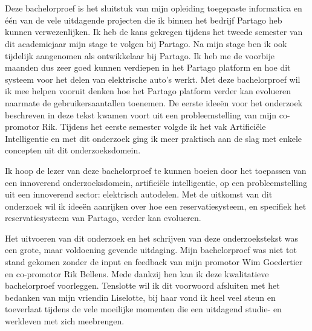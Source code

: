 
\chapter*{}
\label{ch:voorwoord}

Deze bachelorproef is het sluitstuk van mijn opleiding toegepaste informatica en één van de vele uitdagende projecten die ik binnen het bedrijf Partago heb kunnen verwezenlijken. Ik heb de kans gekregen tijdens het tweede semester van dit academiejaar mijn stage te volgen bij Partago. Na mijn stage ben ik ook tijdelijk aangenomen als ontwikkelaar bij Partago. Ik heb me de voorbije maanden dus zeer goed kunnen verdiepen in het Partago platform en hoe dit systeem voor het delen van elektrische auto's werkt. Met deze bachelorproef wil ik mee helpen vooruit denken hoe het Partago platform verder kan evolueren naarmate de gebruikersaantallen toenemen. De eerste ideeën voor het onderzoek beschreven in deze tekst kwamen voort uit een probleemstelling van mijn co-promotor Rik. Tijdens het eerste semester volgde ik het vak Artificiële Intelligentie en met dit onderzoek ging ik meer praktisch aan de slag met enkele concepten uit dit onderzoeksdomein.

Ik hoop de lezer van deze bachelorproef te kunnen boeien door het toepassen van een innoverend onderzoeksdomein, artificiële intelligentie, op een probleemstelling uit een innoverend sector: elektrisch autodelen. Met de uitkomst van dit onderzoek wil ik ideeën aanrijken over hoe een reservatiesysteem, en specifiek het reservatiesysteem van Partago, verder kan evolueren.  
 
Het uitvoeren van dit onderzoek en het schrijven van deze onderzoekstekst was een grote, maar voldoening gevende uitdaging. Mijn bachelorproef was niet tot stand gekomen zonder de input en feedback van mijn promotor Wim Goedertier en co-promotor Rik Bellens. Mede dankzij hen kan ik deze kwalitatieve bachelorproef voorleggen. Tenslotte wil ik dit voorwoord afsluiten met het bedanken van mijn vriendin Liselotte, bij haar vond ik heel veel steun en toeverlaat tijdens de vele moeilijke momenten die een uitdagend studie- en werkleven met zich meebrengen.

